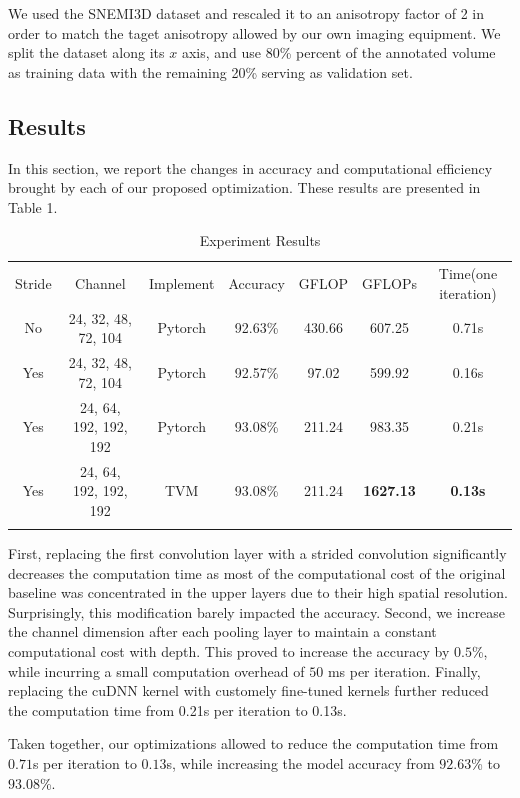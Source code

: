 \documentclass[runningheads]{llncs}
\begin{document}
We used the SNEMI3D dataset and rescaled it to an anisotropy factor of 2 in order 
to match the taget anisotropy allowed by our own imaging equipment.
We split the dataset along its $x$ axis, and use 80\% percent of the annotated volume as training data
with the remaining 20\% serving as validation set.

\subsection{Results}

In this section, we report the changes in accuracy and computational efficiency
brought by each of our proposed optimization. 
These results are presented in Table 1.

\begin{table}
\centering
\caption{Experiment Results}
\label{tab:1}
\begin{tabular}{ccccccc}
\hline\noalign{\smallskip}
Stride & Channel & Implement & Accuracy & GFLOP & GFLOPs & Time(one iteration)  \\
\noalign{\smallskip}\hline\noalign{\smallskip}
No & 24, 32, 48, 72, 104 & Pytorch & 92.63\% &  430.66 & 607.25 & 0.71s\\
Yes & 24, 32, 48, 72, 104 & Pytorch & 92.57\% &  97.02 & 599.92 & 0.16s\\
Yes & 24, 64, 192, 192, 192 & Pytorch & 93.08\% &  211.24 & 983.35 & 0.21s\\
Yes & 24, 64, 192, 192, 192 & TVM & 93.08\% & 211.24 & \textbf{1627.13} &  \textbf{0.13s}\\
\noalign{\smallskip}\hline
\end{tabular}
\end{table}

First, replacing the first convolution layer with a strided convolution significantly decreases the computation time
as most of the computational cost of the original baseline was concentrated in the upper layers due to their high spatial resolution.
Surprisingly, this modification barely impacted the accuracy.
Second, we increase the channel dimension after each pooling layer to maintain a constant computational cost with depth.
This proved to increase the accuracy by $0.5$\%, while incurring a small computation overhead of $50$ ms per iteration.  
Finally, replacing the cuDNN kernel with customely fine-tuned kernels further reduced the computation time from 0.21s per iteration to 0.13s.

Taken together, our optimizations allowed to reduce the computation time from $0.71$s per iteration to $0.13$s, 
while increasing the model accuracy from $92.63$\% to $93.08$\%.
\end{document}
